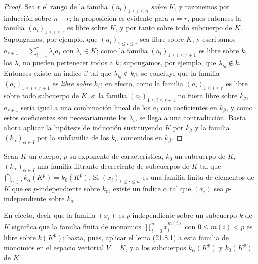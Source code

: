 \begin{proof}
Sea $r$ el rango de la familia $(a_i)_{1\leqslant i\leqslant n}$ \emph{sobre} $K$, y
razonemos por inducción sobre $n-r$; la proposición es evidente para $n=r$,
pues entonces la familia $(a_i)_{1\leqslant i\leqslant r}$ es libre sobre $K$, y
por tanto sobre todo subcuerpo de $K$. Supongamos, por ejemplo, que
$(a_i)_{1\leqslant i\leqslant r}$ sea libre sobre $K$, y escribamos
$a_{r+1}=\sum_{i=1}^r\lambda_i a_i$ con $\lambda_i\in K$; como la familia
$(a_i)_{1\leqslant i\leqslant r+1}$ es libre sobre $k$, los $\lambda_i$ no
pueden pertenecer todos a $k$; supongamos, por ejemplo, que
$\lambda_{i_0}\notin k$. Entonces existe un índice $\beta$ tal que
$\lambda_{i_0}\notin k_\beta$; se concluye que la familia
$(a_i)_{1\leqslant i\leqslant r+1}$ es \emph{libre sobre} $k_\beta$; en efecto, como la
familia $(a_i)_{1\leqslant i\leqslant r}$ es libre sobre todo subcuerpo de
$K$, si la familia $(a_i)_{1\leqslant i\leqslant r+1}$ no fuera libre sobre
$k_\beta$, $a_{r+1}$ sería igual a una combinación lineal de los $a_i$ con
coeficientes en $k_\beta$, y como estos coeficientes son necesariamente los
$\lambda_i$, se llega a una contradicción. Basta ahora aplicar la hipótesis de
inducción sustituyendo $K$ por $k_\beta$ y la familia $(k_\alpha)_{\alpha\in I}$
por la subfamilia de los $k_\alpha$ contenidos en $k_\beta$.
\end{proof}

\begin{lemma}[21.8.2]
\label{0.21.8.2-fr}
Sean $K$ un cuerpo, $p$ su exponente de característica, $k_0$ un subcuerpo de
$K$, $(k_\alpha)_{\alpha\in I}$ una familia filtrante decreciente de
subcuerpos de $K$ tal que $\bigcap_{\alpha\in I}k_\alpha(K^p)=k_0(K^p)$.
Si $(x_i)_{1\leqslant i\leqslant n}$ es una familia finita de elementos de $K$
que es $p$-independiente sobre $k_0$, existe un índice $\alpha$ tal que $(x_i)$ sea
$p$-independiente sobre $k_\alpha$.

En efecto, decir que la familia $(x_i)$ es $p$-independiente sobre un subcuerpo $k$
de $K$ significa que la familia finita de monomios
$\prod_{i=0}^n x_i^{m(i)}$ con $0\leqslant m(i)<p$ es libre sobre $k(K^p)$;
basta, pues, aplicar el lema (21.8.1) a esta familia de monomios en el
espacio vectorial $V=K$, y a los subcuerpos $k_\alpha(K^p)$ y $k_0(K^p)$
de $K$.
\end{lemma}

